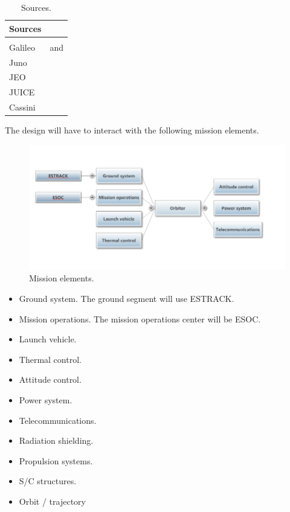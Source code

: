 \begin{table}[h]
  \caption{Sources.}
  \begin{tabular}{p{}p{}}
    Sources & \\ \hline & \\

    Galileo & \cite{galileonasa} and \cite{galileojpl} \\

    Juno & \cite{junonasa} \\

    JEO & \cite{jeonasa} \\

    JUICE & \cite{juiceesa} \\

    Cassini & \cite{cassininasa} \\
  \end{tabular}
\end{table}



The design will have to interact with the following mission elements.

\begin{figure}[h]
  \caption{Mission elements.}
  \includegraphics[width=\textwidth]{block-diagram-WP1-1B}
\end{figure}

\begin{itemize}
\item{Ground system.} The ground segment will use ESTRACK.
\item{Mission operations.} The mission operations center will be ESOC.
\item{Launch vehicle.}
\item{Thermal control.}
\item{Attitude control.}
\item{Power system.}
\item{Telecommunications.}
\item{Radiation shielding.}
\item{Propulsion systems.}
\item{S/C structures.}
\item{Orbit / trajectory}
\end{itemize}

